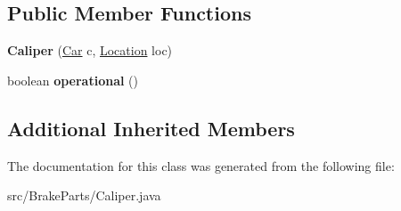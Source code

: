 \subsection*{Public Member Functions}
\begin{DoxyCompactItemize}
\item 
\hypertarget{classBrakeParts_1_1Caliper_a6b603ed597c11c5cb576d61b3ed8db00}{}{\bfseries Caliper} (\hyperlink{classCars_1_1Car}{Car} c, \hyperlink{enumEnums_1_1Location}{Location} loc)\label{classBrakeParts_1_1Caliper_a6b603ed597c11c5cb576d61b3ed8db00}

\item 
\hypertarget{classBrakeParts_1_1Caliper_a5fda33282ada86c76b46e5407b6e686c}{}boolean {\bfseries operational} ()\label{classBrakeParts_1_1Caliper_a5fda33282ada86c76b46e5407b6e686c}

\end{DoxyCompactItemize}
\subsection*{Additional Inherited Members}


The documentation for this class was generated from the following file\+:\begin{DoxyCompactItemize}
\item 
src/\+Brake\+Parts/Caliper.\+java\end{DoxyCompactItemize}

